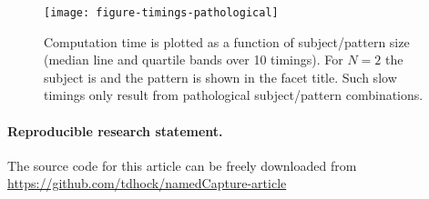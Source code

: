 \begin{figure}
  \texttt{[image: figure-timings-pathological]}
  \vskip -0.5cm
  \caption{\label{fig:timings-pathological} Computation time is
    plotted as a function of subject/pattern size (median line and
    quartile bands over 10 timings). For $N=2$ the subject is 
    and the pattern is shown in the facet title. Such slow timings
    only result from pathological subject/pattern combinations.}
\end{figure}


\paragraph{Reproducible research statement.} The source code for this
article can be freely downloaded from
\url{https://github.com/tdhock/namedCapture-article}



\address{Toby Dylan Hocking\\
  School of Informatics, Computing, and Cyber Systems\\
  Northern Arizona University\\
  Flagstaff, Arizona\\
  USA\\
  }
